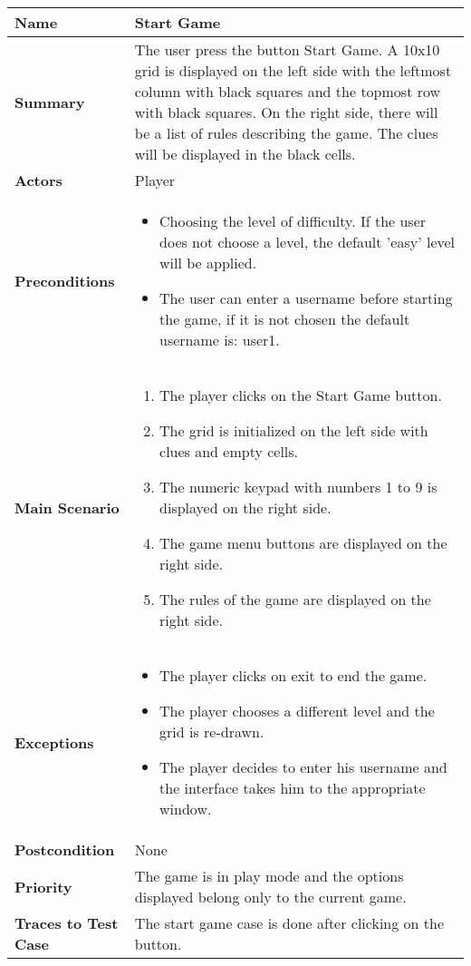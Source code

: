 \documentclass[12pt]{article}
\begin{document}
\begin{tabular}{|p{}|p{}|}
\hline
\bf Name & Start Game \\ \hline
\bf Summary & The user press the button Start Game. A 10x10 grid is displayed  on the left side with the leftmost column with black squares and the topmost row with black squares. On the right side, there will be a list of rules describing the game. The clues will be displayed in the black cells. \\ \hline
\bf Actors & Player \\ \hline
\bf Preconditions & 
\begin{itemize}
    \item Choosing the level of difficulty. If the user does not choose a level, the default 'easy' level will be applied.
    \item The user can enter a username before starting the game, if it is not chosen the default username is: user1. 
\end{itemize} \\ \hline
\bf Main Scenario & 
\begin{enumerate}
  \item The player clicks on the Start Game button.
  \item The grid is initialized on the left side with clues and empty cells.
  \item The numeric keypad with numbers 1 to 9 is displayed on the right side.
  \item The game menu buttons are displayed on the right side.
  \item The rules of the game are displayed on the right side.
\end{enumerate} \\ \hline
\bf Exceptions & 
\begin{itemize}
    \item The player clicks on exit to end the game.
    \item The player chooses a different level and the grid is re-drawn.
    \item The player decides to enter his username and the interface takes him to the appropriate window.
\end{itemize} \\ \hline
\bf Postcondition & None \\ \hline
\bf Priority & The game is in play mode and the options displayed belong only to the current game. \\ \hline
\bf Traces to Test Case & The start game case is done after clicking on the button. \\ \hline
\end{tabular}
\end{document}
